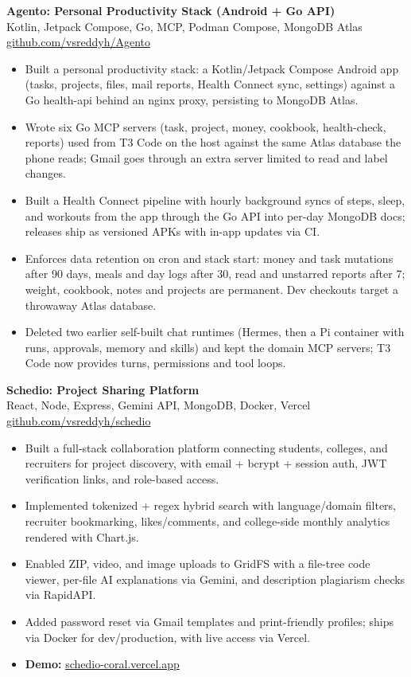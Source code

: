 \documentclass[a4paper,11pt]{article}
\newcommand{\resumeItem}[1]{\item \small{#1}}
\newcommand{\resumeSubheading}[4]{%
  \textbf{#1} \hfill \textbf{#2} \\
{#3} \hfill {#4}
}
\newcommand{\resumeSubHeadingListStart}{\begin{itemize}}
\newcommand{\resumeSubHeadingListEnd}{\end{itemize}}
\begin{document}
\resumeSubheading
{Agento: Personal Productivity Stack (Android + Go API)}{}{Kotlin, Jetpack Compose, Go, MCP, Podman Compose, MongoDB Atlas}{\href{https://github.com/vsreddyh/Agento}{github.com/vsreddyh/Agento}}
\resumeSubHeadingListStart
\resumeItem{Built a personal productivity stack: a Kotlin/Jetpack Compose Android app (tasks, projects, files, mail reports, Health Connect sync, settings) against a Go health-api behind an nginx proxy, persisting to MongoDB Atlas.}
\resumeItem{Wrote six Go MCP servers (task, project, money, cookbook, health-check, reports) used from T3 Code on the host against the same Atlas database the phone reads; Gmail goes through an extra server limited to read and label changes.}
\resumeItem{Built a Health Connect pipeline with hourly background syncs of steps, sleep, and workouts from the app through the Go API into per-day MongoDB docs; releases ship as versioned APKs with in-app updates via CI.}
\resumeItem{Enforces data retention on cron and stack start: money and task mutations after 90 days, meals and day logs after 30, read and unstarred reports after 7; weight, cookbook, notes and projects are permanent. Dev checkouts target a throwaway Atlas database.}
\resumeItem{Deleted two earlier self-built chat runtimes (Hermes, then a Pi container with runs, approvals, memory and skills) and kept the domain MCP servers; T3 Code now provides turns, permissions and tool loops.}
\resumeSubHeadingListEnd

\resumeSubheading
{Schedio: Project Sharing Platform}{}{React, Node, Express, Gemini API, MongoDB, Docker, Vercel}{\href{https://github.com/vsreddyh/schedio}{github.com/vsreddyh/schedio}}
\resumeSubHeadingListStart
\resumeItem{Built a full-stack collaboration platform connecting students, colleges, and recruiters for project discovery, with email + bcrypt + session auth, JWT verification links, and role-based access.}
\resumeItem{Implemented tokenized + regex hybrid search with language/domain filters, recruiter bookmarking, likes/comments, and college-side monthly analytics rendered with Chart.js.}
\resumeItem{Enabled ZIP, video, and image uploads to GridFS with a file-tree code viewer, per-file AI explanations via Gemini, and description plagiarism checks via RapidAPI.}
\resumeItem{Added password reset via Gmail templates and print-friendly profiles; ships via Docker for dev/production, with live access via Vercel.}
\resumeItem{\textbf{Demo:} \href{https://schedio-coral.vercel.app}{schedio-coral.vercel.app}}
\resumeSubHeadingListEnd
\end{document}
